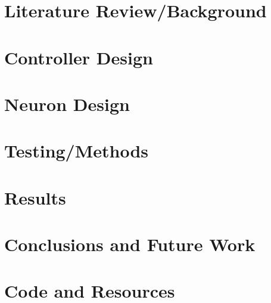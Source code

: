 \documentclass[12pt, letterpaper, oneside, onecolumn]{report} %
\begin{document}
\chapter{Literature Review/Background}
\label{chap:lit_review}


\chapter{Controller Design}
\label{chap:controller_design}


\chapter{Neuron Design}
\label{chap:neuron_design}


\chapter{Testing/Methods}
\label{chap:methods}


\chapter{Results}
\label{chap:results}


\chapter{Conclusions and Future Work}
\label{chap:conclusion}


\newpage
\appendix
{}
\chapter{Code and Resources}
\label{app:resources}


\newpage
\label{chap:references}
\printbibliography[heading=bibintoc, title={Bibliography}]
\end{document}
